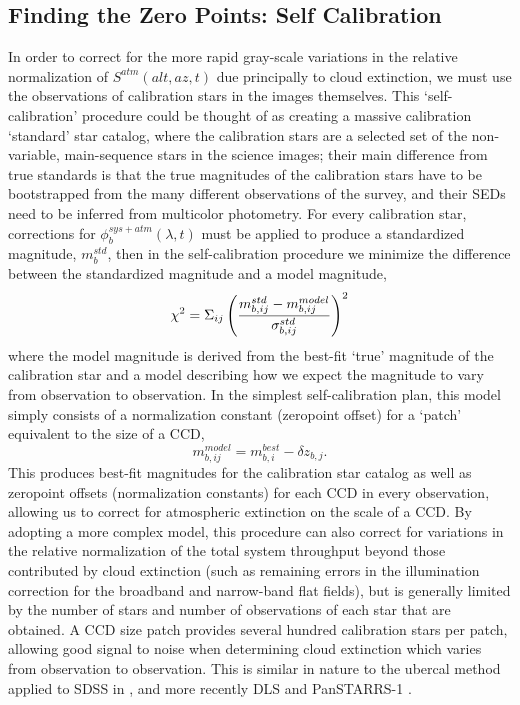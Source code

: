 \documentclass[12pt,preprint]{aastex}
\begin{document}
\subsection{Finding the Zero Points: Self Calibration}
In order to correct for the more rapid gray-scale variations in the
relative normalization of $S^{atm}(alt,az,t)$ due principally to cloud extinction,
we must use the observations of calibration stars in the images themselves. This
`self-calibration' procedure could be thought of as creating a massive
calibration `standard' star catalog, where the calibration stars are
a selected set of the non-variable, main-sequence stars in the science images;
their main difference from true standards is that the true magnitudes of the calibration
stars have to be bootstrapped from the many different observations of
the survey, and their SEDs need to be inferred from multicolor photometry.
For every calibration star, corrections for
 $\phi_b^{sys+atm}(\lambda,t)$ must be
applied to produce a standardized magnitude, $m_b^{std}$, then in the
self-calibration procedure we minimize the difference between the
standardized magnitude and a model magnitude,
\begin{equation}
\label{eqn:chi2}
\chi^2 = \Sigma_{ij} \left( { m_{b,ij}^{std} - m_{b,ij}^{model} \over
\sigma_{b,ij}^{std} } \right)^2
\end{equation}
where the model magnitude is derived from the best-fit `true'
magnitude of the calibration star and a model describing how we expect
the magnitude to vary from observation to observation. In the simplest
self-calibration plan, this model simply consists of a normalization constant
(zeropoint offset) for a `patch' equivalent to the size of a CCD,
\begin{equation}
\label{eqn:modelmag}
m_{b,ij}^{model} = m_{b,i}^{best} - \delta z_{b,j}.
\end{equation}
This produces best-fit magnitudes for the calibration star catalog as
well as zeropoint offsets (normalization constants) for each CCD in
every observation, allowing us to correct for atmospheric extinction
on the scale of a CCD. By adopting a more complex model, this
procedure can also correct for variations in the relative
normalization of the total system throughput beyond those contributed
by cloud extinction (such as remaining errors in the illumination
correction for the broadband and narrow-band flat fields), but is
generally limited by the number of stars and number of observations of
each star that are obtained. A CCD size patch provides several hundred
calibration stars per patch, allowing good signal to noise when determining cloud
extinction which varies from observation to observation.
This is similar in
nature to the ubercal method applied to SDSS in
\citet{Padmanabhan2008}, and more recently DLS \citep{Wittman2012} and PanSTARRS-1 \citep{Schlafly2012}.
\end{document}
